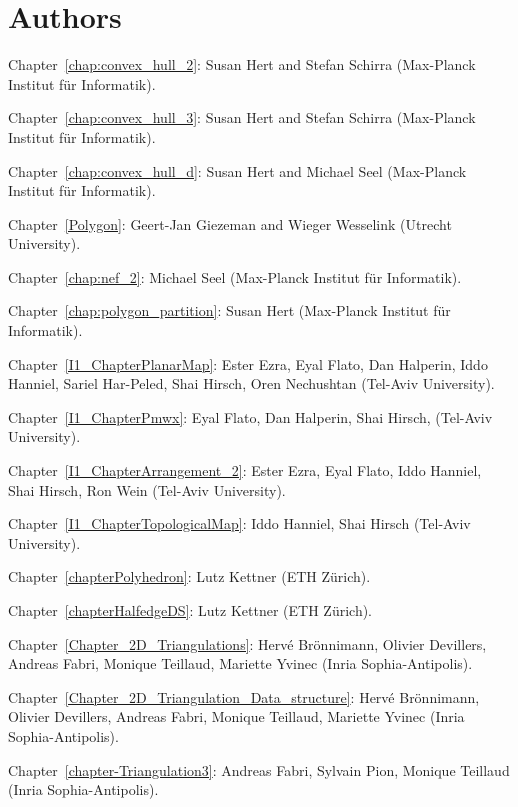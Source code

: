 \section*{Authors}

\noindent
Chapter~\ref{chap:convex_hull_2}: Susan Hert and Stefan Schirra 
(Max-Planck Institut f\"ur Informatik).

\noindent
Chapter~\ref{chap:convex_hull_3}: Susan Hert and Stefan Schirra 
(Max-Planck Institut f\"ur Informatik).

\noindent
Chapter~\ref{chap:convex_hull_d}: Susan Hert and Michael Seel 
(Max-Planck Institut f\"ur Informatik).

\noindent
Chapter~\ref{Polygon}: Geert-Jan Giezeman and Wieger Wesselink 
(Utrecht University).

\noindent
Chapter~\ref{chap:nef_2}: Michael Seel 
(Max-Planck Institut f\"ur Informatik).

\noindent
Chapter~\ref{chap:polygon_partition}: Susan Hert 
(Max-Planck Institut f\"ur Informatik).

\noindent
Chapter~\ref{I1_ChapterPlanarMap}: Ester Ezra, Eyal Flato, Dan Halperin, 
Iddo Hanniel, Sariel Har-Peled, Shai Hirsch, Oren Nechushtan 
(Tel-Aviv University).

\noindent
Chapter~\ref{I1_ChapterPmwx}: Eyal Flato, Dan Halperin, Shai Hirsch,
(Tel-Aviv University).

\noindent
Chapter~\ref{I1_ChapterArrangement_2}: Ester Ezra, Eyal Flato, 
Iddo Hanniel, Shai Hirsch, Ron Wein (Tel-Aviv University).

\noindent
Chapter~\ref{I1_ChapterTopologicalMap}: Iddo Hanniel, Shai Hirsch 
(Tel-Aviv University).

\noindent
Chapter~\ref{chapterPolyhedron}: Lutz Kettner (ETH Z\"urich).

\noindent
Chapter~\ref{chapterHalfedgeDS}: Lutz Kettner (ETH Z\"urich).

\noindent
Chapter~\ref{Chapter_2D_Triangulations}: 
Herv\'e Br\"onnimann, Olivier Devillers, Andreas Fabri,
Monique Teillaud, Mariette Yvinec ({\sc Inria} Sophia-Antipolis).

\noindent
Chapter~\ref{Chapter_2D_Triangulation_Data_structure}: 
Herv\'e Br\"onnimann, Olivier Devillers, Andreas Fabri,
Monique Teillaud, Mariette Yvinec ({\sc Inria} Sophia-Antipolis).


\noindent
Chapter~\ref{chapter-Triangulation3}: 
Andreas Fabri, Sylvain Pion, Monique Teillaud ({\sc Inria} Sophia-Antipolis).

